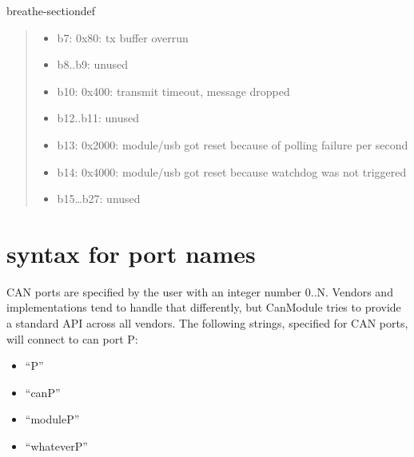 \documentclass[a4paper,10pt,english]{sphinxmanual}
\begin{document}
\begin{fulllineitems}
\begin{sphinxuseclass}{breathe-sectiondef}
\begin{fulllineitems}
\begin{quote}
\begin{description}
\begin{itemize}
\begin{itemize}
\item {} 
\sphinxAtStartPar
b7: 0x80: tx buffer overrun

\item {} 
\sphinxAtStartPar
b8..b9: unused

\item {} 
\sphinxAtStartPar
b10: 0x400: transmit timeout, message dropped

\item {} 
\sphinxAtStartPar
b12..b11: unused

\item {} 
\sphinxAtStartPar
b13: 0x2000: module/usb got reset because of polling failure per second

\item {} 
\sphinxAtStartPar
b14: 0x4000: module/usb got reset because watchdog was not triggered

\item {} 
\sphinxAtStartPar
b15…b27: unused 

\end{itemize}


\end{itemize}

\end{description}\end{quote}

\end{fulllineitems}


\end{sphinxuseclass}
\end{fulllineitems}



\section{syntax for port names}
\label{\detokenize{canports:syntax-for-port-names}}
\sphinxAtStartPar
CAN ports are specified by the user with an integer number 0..N.
Vendors and implementations tend to handle that differently, but CanModule tries to provide a
standard API across all vendors. The following strings, specified for CAN ports, will connect
to can port P:
\begin{itemize}
\item {} 
\sphinxAtStartPar
“P”

\item {} 
\sphinxAtStartPar
“canP”

\item {} 
\sphinxAtStartPar
“moduleP”

\item {} 
\sphinxAtStartPar
“whateverP”

\end{itemize}
\end{document}
